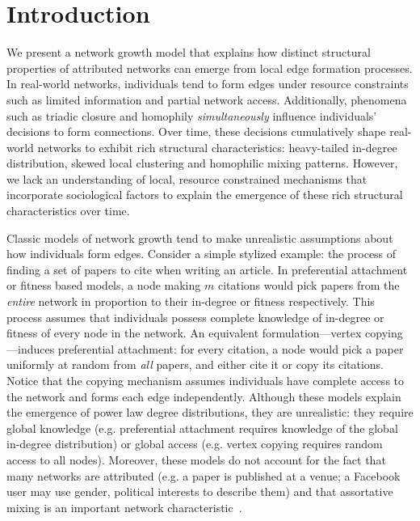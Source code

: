 \section{Introduction}
\label{sec:Introduction}



We present a network growth model that explains how distinct
structural properties of attributed networks can emerge from local edge
formation processes. In real-world networks, individuals tend to form edges
under resource constraints such as limited information and partial network access.
Additionally, phenomena such as triadic closure and homophily
\textit{simultaneously} influence individuals' decisions to form connections.
Over time, these decisions cumulatively shape real-world networks to exhibit
rich structural characteristics: heavy-tailed in-degree distribution, skewed
local clustering and homophilic mixing patterns. However, we lack an
understanding of local, resource constrained mechanisms that incorporate
sociological factors to explain the emergence of these rich structural
characteristics over time.




Classic models of network growth tend to make unrealistic assumptions about how
individuals form edges. Consider a simple stylized example: the process of
finding a set of papers to cite when writing an article. In preferential
attachment \cite{barabasi1999emergence} or fitness
\cite{bianconi2001bose,caldarelli2002scale,wang2013quantifying} based models, a
node making $m$ citations would pick papers from the \textit{entire} network in
proportion to their in-degree or fitness respectively. This process assumes that
individuals possess {complete} knowledge of in-degree or fitness of every node
in the network. An equivalent formulation---vertex copying
\cite{kumar2000stochastic}---induces preferential attachment: for every
citation, a node would pick a paper uniformly at random from \textit{all}
papers, and either cite it or copy its citations. Notice that the copying
mechanism assumes individuals have complete access to the network and forms each
edge independently. Although these models explain the emergence of power law
degree distributions, they are unrealistic: they require global knowledge (e.g.
preferential attachment requires knowledge of the global in-degree distribution)
or global access (e.g. vertex copying requires random access to all nodes).
Moreover, these models do not account for the fact that many
networks are attributed (e.g. a paper is published at a venue; a Facebook user
may use gender, political interests to describe them) and that assortative
mixing is an important network characteristic~\cite{newman2002assortative}.

